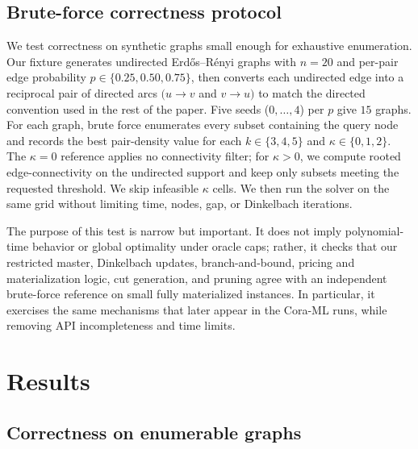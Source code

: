 \documentclass[12pt]{article}
\begin{document}
\subsection{Brute-force correctness protocol}
\label{subsec:correctness-protocol}

We test correctness on synthetic graphs small enough for exhaustive enumeration.  Our fixture generates undirected Erd\H{o}s--R\'enyi graphs with $n=20$ and per-pair edge probability $p\in\{0.25,0.50,0.75\}$, then converts each undirected edge into a reciprocal pair of directed arcs $(u\to v$ and $v\to u)$ to match the directed convention used in the rest of the paper.  Five seeds ($0,\ldots,4$) per $p$ give $15$ graphs.  For each graph, brute force enumerates every subset containing the query node and records the best pair-density value for each $k\in\{3,4,5\}$ and $\kappa\in\{0,1,2\}$.  The $\kappa=0$ reference applies no connectivity filter; for $\kappa>0$, we compute rooted edge-connectivity on the undirected support and keep only subsets meeting the requested threshold.  We skip infeasible $\kappa$ cells.  We then run the solver on the same grid without limiting time, nodes, gap, or Dinkelbach iterations.

The purpose of this test is narrow but important.  It does not imply polynomial-time behavior or global optimality under oracle caps; rather, it checks that our restricted master, Dinkelbach updates, branch-and-bound, pricing and materialization logic, cut generation, and pruning agree with an independent brute-force reference on small fully materialized instances.  In particular, it exercises the same mechanisms that later appear in the Cora-ML runs, while removing API incompleteness and time limits.


\section{Results}
\label{sec:results}

\subsection{Correctness on enumerable graphs}
\label{subsec:correctness-results}
\end{document}
